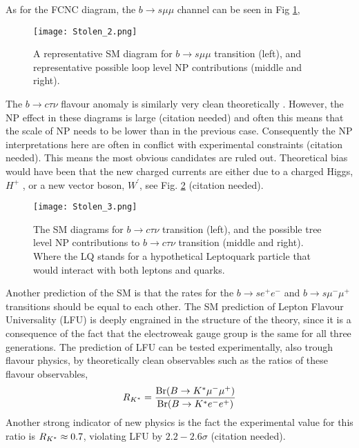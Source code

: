 As for the FCNC diagram, the $b \rightarrow s \mu \mu$ channel can be seen in Fig \ref{fig:Flavour_D_2_Muon}, 
%
\begin{figure}[H]
	\centering
	\texttt{[image: Stolen\_2.png]}
	\caption{A representative SM diagram for $b \rightarrow s \mu \mu$ transition (left), and representative possible loop level NP
contributions (middle and right).}
	\label{fig:Flavour_D_2_Muon}
\end{figure}
%
The $b \rightarrow c \tau \nu$ flavour anomaly is similarly very clean theoretically \cite{Fajfer_2012}. However, the NP effect in these diagrams is large {\color{blue} (citation needed)} and often this means that the scale of NP needs to be lower than in the previous case. Consequently the NP interpretations here are often in conflict with experimental constraints {\color{blue} (citation needed)}.
%
This means the most obvious candidates are ruled out. Theoretical bias would have been that the new charged currents are either due to a charged Higgs, $H^+$ , or a new vector boson, $W^\prime$, see Fig. \ref{fig:Flavour_D_3_Tau} {\color{blue} (citation needed)}.
%
\begin{figure}[H]	
	\centering
	\texttt{[image: Stolen\_3.png]}
	\caption{The SM diagrams for $b \rightarrow c \tau \nu$ transition (left), and the possible tree level NP contributions to $b \rightarrow c \tau \nu$ transition (middle and right). Where the LQ stands for a hypothetical Leptoquark particle that would interact with both leptons and quarks.}
	\label{fig:Flavour_D_3_Tau}
\end{figure}
%
Another prediction of the SM is that the rates for the  $b \rightarrow s e^+ e^-$ and  $b \rightarrow s \mu^- \mu^+$ transitions should be equal to each other.
%
The SM prediction of Lepton Flavour Universality (LFU) is deeply engrained in the structure of the theory, since it is a consequence of the fact that the electroweak gauge group is the same for all three generations. 
%
The prediction of LFU can be tested experimentally, also trough flavour physics, by theoretically clean observables such as the ratios of these flavour observables, 
%
\begin{equation}
R_{K^{\**}} = \frac{\text{Br}( B \rightarrow K^{\**} \mu^- \mu^+ )}{\text{Br} (  B \rightarrow K^{\**} e^- e^+  )}
\end{equation}
% 
Another strong indicator of new physics is the fact the experimental value for this ratio is $R_{K^{\**}} \approx 0.7$, violating LFU by $2.2 - 2.6 \sigma$ {\color{blue} (citation needed)}.

